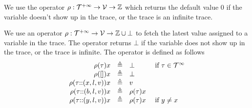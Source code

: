 We use the operator $\rho: {\mathcal{T}^{+\infty}} \to \mathcal{V} \to \mathbb{Z}$ 
 which returns the default value $0$ if the variable doesn't show up in the trace, or the trace is an infinite trace.


We use an operator $\rho: {\mathcal{T}^{+\infty}} \to \mathcal{V} \to \mathbb{Z}\cup\bot$ to fetch the latest value assigned to a variable in the trace. The operator returns $\bot$ if the variable does not show up in the trace, or the trace is infinite. The operator is defined as follows
    \[
\begin{array}{rcll}
\rho(\mathtt{\tau} ) x &\triangleq& \bot &~ \text{if}~ \mathtt{\tau} \in \mathcal{T}^{\infty}\\
 \rho({[]} ) x &\triangleq& \bot&\\
\rho(\mathtt{\tau}  {\small ::} (x, l, v)) x &\triangleq& v
\\
\rho(\mathtt{\tau} {\small ::} (b, l, v)) x &\triangleq& \rho(\mathtt{\tau}) x
\\
\rho(\mathtt{\tau} {\small ::} (y, l, v)) x &\triangleq& \rho(\mathtt{\tau}) x & ~ \text{if}~ y \neq x
\end{array}
\]
 


